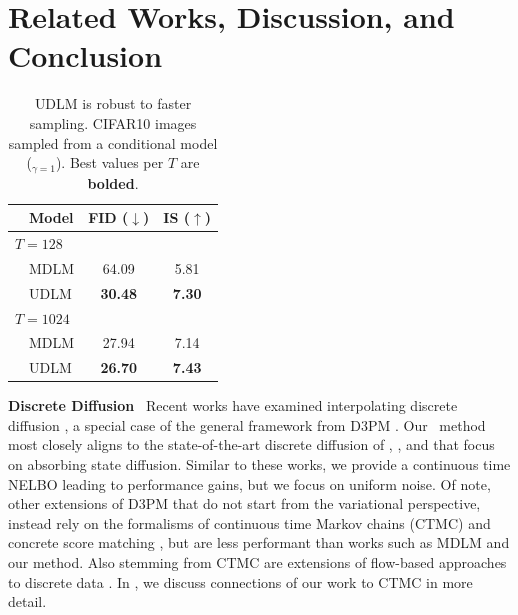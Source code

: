 \documentclass{article} %
\begin{document}
\section{Related Works, Discussion, and Conclusion}\label{sec:related}
\begin{table}
    \vspace{-1.1em}
    \small
    \centering
    \caption{UDLM is robust to faster sampling.
    CIFAR10 images sampled from a conditional model (\cfg$_{\gamma=1}$).
    Best values per $T$ are \textbf{bolded}.
    }
    \label{tab:cifar10_T_ablation}
    \begin{tabular}{llcc}
        \toprule
         & Model & FID ($\downarrow$) & IS ($\uparrow$) \\
         \midrule
         \multicolumn{4}{l}{$T=128$} \\
         & MDLM & 64.09 & 5.81\\
         & UDLM & \bf{30.48} & \bf{7.30}\\
         \multicolumn{4}{l}{$T=1024$} \\
         & MDLM & 27.94 & 7.14\\
         & UDLM & \bf{26.70} & \bf{7.43} \\
         \bottomrule
    \end{tabular}
\end{table}
\textbf{Discrete Diffusion}~
Recent works have examined interpolating discrete diffusion \citep{ou2024your, sahoo2024simple, shi2024simplified, zhao2024improving, zheng2023reparameterized}, a special case of the general framework from D3PM \citep{austin2021structured}.
Our \method~method most closely aligns to the state-of-the-art discrete diffusion of \cite{ou2024your}, \cite{sahoo2024simple}, and \cite{shi2024simplified} that focus on absorbing state diffusion.
Similar to these works, we provide a continuous time NELBO leading to performance gains, but we focus on uniform noise.
Of note, other extensions of D3PM that do not start from the variational perspective,  instead rely on the formalisms of continuous time Markov chains (CTMC) \citep{campbell2022continuous} and concrete score matching \citep{lou2023discrete}, but are less performant than works such as MDLM and our method.
Also stemming from CTMC are extensions of flow-based \citep{lipman2022flow} approaches to discrete data \citep{campbell2024generative, gat2024discrete}.
In , we discuss connections of our work to CTMC in more detail.
\end{document}
